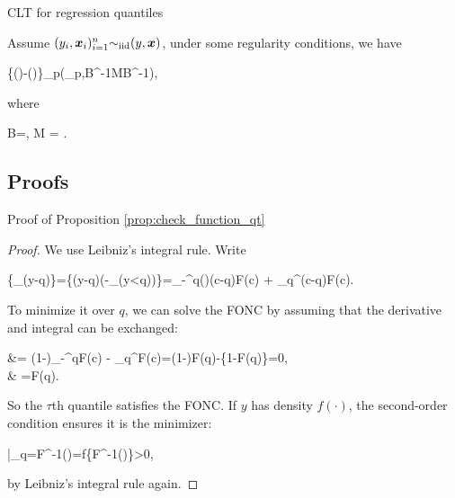 \documentclass[10pt,a4paper]{book}
\begin{document}
\begin{thmbox}{CLT for regression quantiles}
	\begin{theorem}\label{thm:CLT_reg_qt}
		Assume $(y_i,{\boldsymbol x}_i)_{i=1}^n{\sim}_{\mathrm{iid}}(y,{\boldsymbol x})$, under some regularity conditions, we have 
		\begin{sequation*}
			\{\hat{\bab}(\tau)-\bab(\tau)\}\dto \rmN_p(\0_p,B^{-1}MB^{-1}),
		\end{sequation*}
		where 
		\begin{sequation*}
			B=\bbE{}, \qquad 
			M = \bbE\mbk{
				\{\tau-\1_{(y-\x^\TT\bab(\tau)\leq 0)}\}^{2}\x\x^\TT
			}.
		\end{sequation*}
	\end{theorem}
\end{thmbox}



\subsection{Proofs}
\begin{pfbox}{Proof of Proposition \ref{prop:check_function_qt}}
	\begin{proof}
		We use Leibniz's integral rule. Write 
		\begin{salign*}
			\bbE\{\rho_{\tau}(y-q)\}=\bbE\{(y-q)(\tau-\1_{(y<q)})\}=\int_{-\infty }^{q}()(c-q)\rmd F(c) + \int_{q}^{\infty }\tau (c-q)\rmd F(c).
		\end{salign*}
		To minimize it over $q$, we can solve the FONC by assuming that the derivative and integral can be exchanged:
		\begin{salign*}
			 &= (1-\tau)\int_{-\infty }^{q}\rmd F(c) - \tau \int_{q}^{\infty }\rmd F(c)=(1-\tau)F(q)-\tau\{1-F(q)\}=0,\\
			& \Rightarrow \tau=F(q).
		\end{salign*} 
		So the $\tau$th quantile satisfies the FONC.
		If $y$ has density $f(\cdot)$, the second-order condition ensures it is the minimizer:
		\begin{sequation*}
			\bigg|_{q=F^{-1}(\tau)}=f\{F^{-1}(\tau)\}>0,
		\end{sequation*}   
		by Leibniz's integral rule again.
	\end{proof}
\end{pfbox}
\end{document}
